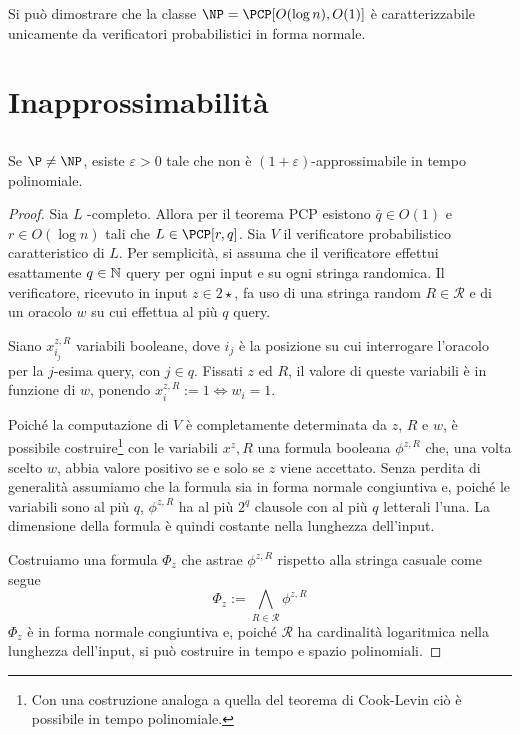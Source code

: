Si può dimostrare che la classe $\NP=\PCP[O(\log n),O(1)]$ è caratterizzabile unicamente da verificatori probabilistici in forma normale.



\section{Inapprossimabilità}


\subsection{\MaxSat}
\begin{theorem}
	Se $\P\neq\NP$, esiste $\varepsilon>0$ tale che \MaxSat non è $(1+\varepsilon)$-approssimabile in tempo polinomiale.
\end{theorem}
\begin{proof}
	\newcommand{\Rand}{\mathcal R}
	Sia $L$ \NP-completo. Allora per il teorema PCP esistono $\bar q\in O(1)$ e $r\in O(\log n)$ tali che $L\in\PCP[r,q]$.
	Sia $V$ il verificatore probabilistico caratteristico di $L$.
	Per semplicità, si assuma che il verificatore effettui esattamente $q\in\mathbb N$ query per ogni input e su ogni stringa randomica.
	Il verificatore, ricevuto in input $z\in 2\star$, fa uso di una stringa random $R\in\Rand$ e di un oracolo $w$ su cui effettua al più $q$ query.

	Siano $x^{z,R}_{i_j}$ variabili booleane, dove $i_j$ è la posizione su cui interrogare l'oracolo per la $j$-esima query, con $j\in q$.
	Fissati $z$ ed $R$, il valore di queste variabili è in funzione di $w$, ponendo $x^{z,R}_i:=1\iff w_i=1$.

	Poiché la computazione di $V$ è completamente determinata da $z$, $R$ e $w$, è possibile costruire\footnote{Con una costruzione analoga a quella del teorema di Cook-Levin ciò è possibile in tempo polinomiale.} con le variabili $x^z,R$ una formula booleana $\phi^{z,R}$ che, una volta scelto $w$, abbia valore positivo se e solo se $z$ viene accettato.
	Senza perdita di generalità assumiamo che la formula sia in forma normale congiuntiva e, poiché le variabili sono al più $q$, $\phi^{z,R}$ ha al più $2^q$ clausole con al più $q$ letterali l'una. La dimensione della formula è quindi costante nella lunghezza dell'input.

	Costruiamo una formula $\Phi_z$ che astrae $\phi^{z,R}$ rispetto alla stringa casuale come segue
	\begin{equation*}
		\Phi_z := \bigwedge_{R\in\Rand} \phi^{z,R}
	\end{equation*}
	$\Phi_z$ è in forma normale congiuntiva e, poiché $\Rand$ ha cardinalità logaritmica nella lunghezza dell'input, si può costruire in tempo e spazio polinomiali.


\end{proof}

